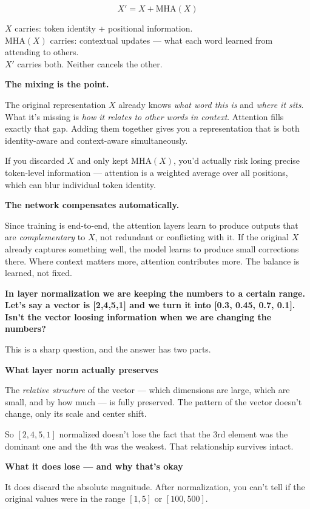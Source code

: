 \[
X' = X + \text{MHA}(X)
\]

$X$ carries: token identity + positional information.\\
MHA$(X)$ carries: contextual updates --- what each word learned from attending to others.\\
$X'$ carries both. Neither cancels the other.

\bigskip
\textbf{The mixing is the point.}

The original representation $X$ already knows \textit{what word this is} and \textit{where it sits}. What it's missing is \textit{how it relates to other words in context}. Attention fills exactly that gap. Adding them together gives you a representation that is both identity-aware and context-aware simultaneously.

If you discarded $X$ and only kept MHA$(X)$, you'd actually risk losing precise token-level information --- attention is a weighted average over all positions, which can blur individual token identity.

\bigskip
\textbf{The network compensates automatically.}

Since training is end-to-end, the attention layers learn to produce outputs that are \textit{complementary} to $X$, not redundant or conflicting with it. If the original $X$ already captures something well, the model learns to produce small corrections there. Where context matters more, attention contributes more. The balance is learned, not fixed.


\bigskip\bigskip
\textbf{In layer normalization we are keeping the numbers to a certain range. Let's say a vector is [2,4,5,1] and we turn it into [0.3, 0.45, 0.7, 0.1]. Isn't the vector loosing information when we are changing the numbers?}

This is a sharp question, and the answer has two parts.

\bigskip
\textbf{What layer norm actually preserves}

The \textit{relative structure} of the vector --- which dimensions are large, which are small, and by how much --- is fully preserved. The pattern of the vector doesn't change, only its scale and center shift.

So $[2, 4, 5, 1]$ normalized doesn't lose the fact that the 3rd element was the dominant one and the 4th was the weakest. That relationship survives intact.

\bigskip
\textbf{What it does lose --- and why that's okay}

It does discard the absolute magnitude. After normalization, you can't tell if the original values were in the range $[1, 5]$ or $[100, 500]$.

